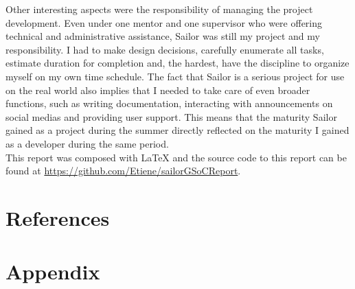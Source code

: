 \documentclass{article}
\begin{document}
Other interesting aspects were the responsibility of managing the project development. Even under one mentor and one supervisor who were offering technical and administrative assistance, Sailor was still my project and my responsibility. I had to make design decisions, carefully enumerate all tasks, estimate duration for completion and, the hardest, have the discipline to organize myself on my own time schedule. The fact that Sailor is a serious project for use on the real world also implies that I needed to take care of even broader functions, such as writing documentation, interacting with announcements on social medias and providing user support. This means that the maturity Sailor gained as a project during the summer directly reflected on the maturity I gained as a developer during the same period.\\

This report was composed with LaTeX and the source code to this report can be found at \url{https://github.com/Etiene/sailorGSoCReport}.



\clearpage
\newpage

\section{References}
	\printbibliography[title={Books},type=book,heading=subbibnumbered]
	\printbibliography[title={Presentations},type=article,heading=subbibnumbered]
	\printbibliography[title={Websites},type=misc,heading=subbibnumbered]

	\newpage
	\section{Appendix}
	\begin{appendix}
	 \listoffigures
  \listoftables
	\end{appendix}
\end{document}

